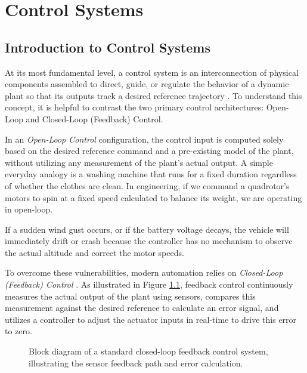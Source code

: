 \chapter{Control Systems}
\label{ch:controls}

\section{Introduction to Control Systems}
At its most fundamental level, a control system is an interconnection of physical components assembled to direct, guide, or regulate the behavior of a dynamic plant so that its outputs track a desired reference trajectory \cite{ref_73}. To understand this concept, it is helpful to contrast the two primary control architectures: Open-Loop and Closed-Loop (Feedback) Control.

In an \textit{Open-Loop Control} configuration, the control input is computed solely based on the desired reference command and a pre-existing model of the plant, without utilizing any measurement of the plant's actual output. A simple everyday analogy is a washing machine that runs for a fixed duration regardless of whether the clothes are clean. In engineering, if we command a quadrotor's motors to spin at a fixed speed calculated to balance its weight, we are operating in open-loop. 

If a sudden wind gust occurs, or if the battery voltage decays, the vehicle will immediately drift or crash because the controller has no mechanism to observe the actual altitude and correct the motor speeds.

To overcome these vulnerabilities, modern automation relies on \textit{Closed-Loop (Feedback) Control} \cite{ref_73}. As illustrated in Figure \ref{fig:feedback_block_diagram}, feedback control continuously measures the actual output of the plant using sensors, compares this measurement against the desired reference to calculate an error signal, and utilizes a controller to adjust the actuator inputs in real-time to drive this error to zero.

\begin{figure}[h!]
\centering
{}
\caption{Block diagram of a standard closed-loop feedback control system, illustrating the sensor feedback path and error calculation.}
\label{fig:feedback_block_diagram}
\end{figure}

